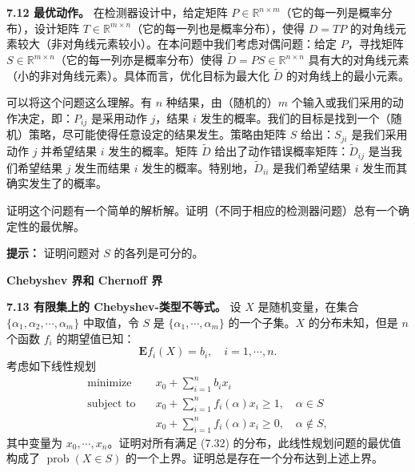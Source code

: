 \documentclass[UTF8,12pt,a4paper,fontset=fandol]{ctexart}
\begin{document}
\noindent\textbf{7.12 最优动作。}\quad
在检测器设计中，给定矩阵 $P\in\mathbb{R}^{n\times m}$（它的每一列是概率分布），设计矩阵 $T\in\mathbb{R}^{m\times n}$（它的每一列也是概率分布），使得 $D=TP$ 的对角线元素较大（非对角线元素较小）。在本问题中我们考虑对偶问题：给定 $P$，寻找矩阵 $S\in\mathbb{R}^{m\times n}$（它的每一列亦是概率分布）使得 $\tilde{D}=PS\in\mathbb{R}^{n\times n}$ 具有大的对角线元素（小的非对角线元素）。具体而言，优化目标为最大化 $\tilde{D}$ 的对角线上的最小元素。

可以将这个问题这么理解。有 $n$ 种结果，由（随机的）$m$ 个输入或我们采用的动作决定，即：$P_{ij}$ 是采用动作 $j$，结果 $i$ 发生的概率。我们的目标是找到一个（随机）策略，尽可能使得任意设定的结果发生。策略由矩阵 $S$ 给出：$S_{ji}$ 是我们采用动作 $j$ 并希望结果 $i$ 发生的概率。矩阵 $\tilde{D}$ 给出了动作错误概率矩阵：$\tilde{D}_{ij}$ 是当我们希望结果 $j$ 发生而结果 $i$ 发生的概率。特别地，$\tilde{D}_{ii}$ 是我们希望结果 $i$ 发生而其确实发生了的概率。

证明这个问题有一个简单的解析解。证明（不同于相应的检测器问题）总有一个确定性的最优解。

\noindent\textbf{提示：}\quad
证明问题对 $S$ 的各列是可分的。

\noindent\textbf{Chebyshev 界和 Chernoff 界}

\noindent\textbf{7.13 有限集上的 Chebyshev-类型不等式。}\quad
设 $X$ 是随机变量，在集合 $\{\alpha_1,\alpha_2,\cdots,\alpha_m\}$ 中取值，令 $S$ 是 $\{\alpha_1,\cdots,\alpha_m\}$ 的一个子集。$X$ 的分布未知，但是 $n$ 个函数 $f_i$ 的期望值已知：
\begin{equation}
\mathbf{E}f_i(X)=b_i,\quad i=1,\cdots,n.
\tag{7.32}
\end{equation}
考虑如下线性规划
\[
\begin{aligned}
\text{minimize}\quad & x_0+\sum_{i=1}^n b_ix_i\\
\text{subject to}\quad & x_0+\sum_{i=1}^n f_i(\alpha)x_i\geq 1,\quad \alpha\in S\\
& x_0+\sum_{i=1}^n f_i(\alpha)x_i\geq 0,\quad \alpha\notin S,
\end{aligned}
\]
其中变量为 $x_0,\cdots,x_n$。证明对所有满足 (7.32) 的分布，此线性规划问题的最优值构成了 $\operatorname{prob}(X\in S)$ 的一个上界。证明总是存在一个分布达到上述上界。
\end{document}
